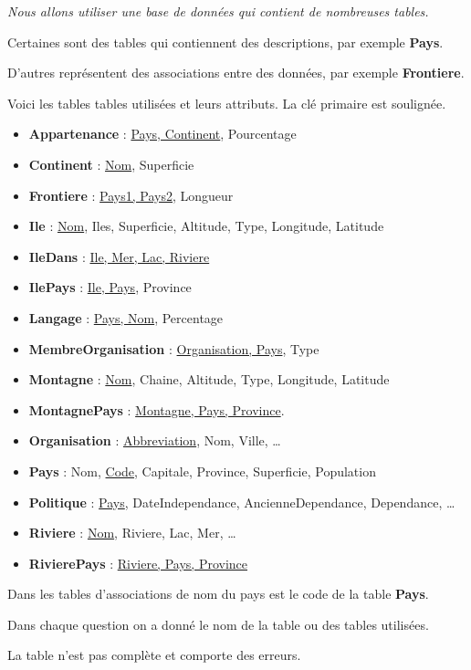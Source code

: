 {\it Nous allons utiliser une base de données qui contient de nombreuses tables.

Certaines sont des tables qui contiennent des descriptions, par exemple \textbf{Pays}.

D'autres représentent des associations entre des données, par exemple \textbf{Frontiere}.

\medskip

Voici les tables tables utilisées et leurs attributs. La clé primaire est soulignée.

\begin{itemize}
\item {\bf Appartenance} : \underline{Pays, Continent}, Pourcentage
\item {\bf Continent} : \underline{Nom}, Superficie
\item {\bf Frontiere} : \underline{Pays1, Pays2}, Longueur
\item {\bf Ile} : \underline{Nom}, Iles, Superficie, Altitude, Type, Longitude, Latitude 
\item {\bf IleDans} : \underline{Ile, Mer, Lac, Riviere}
\item {\bf IlePays} : \underline{Ile, Pays}, Province
\item {\bf Langage} : \underline{Pays, Nom}, Percentage
\item {\bf MembreOrganisation} : \underline{Organisation, Pays}, Type
\item {\bf Montagne} : \underline{Nom}, Chaine, Altitude, Type, Longitude, Latitude 
\item {\bf MontagnePays} : \underline{Montagne, Pays, Province}. 
\item {\bf Organisation} : \underline{Abbreviation}, Nom, Ville, \dots
\item {\bf Pays} : Nom, \underline{Code}, Capitale, Province, Superficie, Population
\item {\bf Politique} : \underline{Pays}, DateIndependance, AncienneDependance, Dependance, \dots
\item {\bf Riviere} : \underline{Nom}, Riviere, Lac, Mer, \dots
\item {\bf RivierePays} : \underline{Riviere, Pays, Province}
\end{itemize}

\medskip

Dans les tables d'associations de nom du pays est le code de la table {\bf Pays}.

Dans chaque question on a donné le nom de la table ou des tables utilisées.

La table n'est pas complète et comporte des erreurs.}
